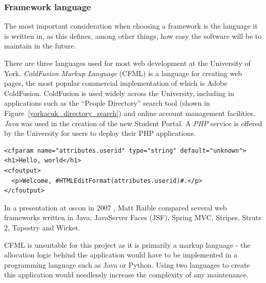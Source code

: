 \documentclass[]{scrartcl}
\begin{document}

\subsubsection{Framework language}


The most important consideration when choosing a framework is the language it
is written in, as this defines, among other things, how easy the software will
be to maintain in the future.


There are three languages used for most web development at the University of
York. \emph{ColdFusion Markup Language} (CFML) is a language for creating web pages,
the most popular commercial implementation of which is Adobe ColdFusion.
ColdFusion is used widely across the University, including in applications
such as the ``People Directory'' search tool (shown in
Figure~\ref{yorkacuk_directory_search}) and online account management
facilities. \emph{Java} was used in the creation of the new Student Portal. A
\emph{PHP} service is offered by the University for users to deploy their PHP
applications.

\begin{lstlisting}
<cfparam name="attributes.userid" type="string" default="unknown">
<h1>Hello, world</h1>
<cfoutput>
  <p>Welcome, #HTMLEditFormat(attributes.userid)#.</p>
</cfoutput>
\end{lstlisting}

In a presentation at \gls{oscon} in 2007 \cite{raible2007javawebframeworks},
Matt Raible compared several web frameworks written in Java; JavaServer Faces
(JSF), Spring MVC, Stripes, Struts 2, Tapestry and Wicket.


CFML is unsuitable for this project as it is primarily a markup language - the
allocation logic behind the application would have to be implemented in a
programming language such as Java or Python. Using two languages to create
this application would needlessly increase the complexity of any maintenance.
\end{document}
